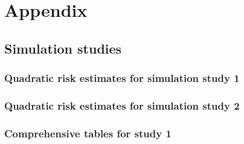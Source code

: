 \chapter{Appendix} \label{appendix}

\section{Simulation studies}

\subsection{Quadratic risk estimates for simulation study 1}






\subsection{Quadratic risk estimates for simulation study 2}










\subsection{Comprehensive tables for study 1}
\begin{landscape}

\end{landscape}


\begin{landscape}

\end{landscape}


